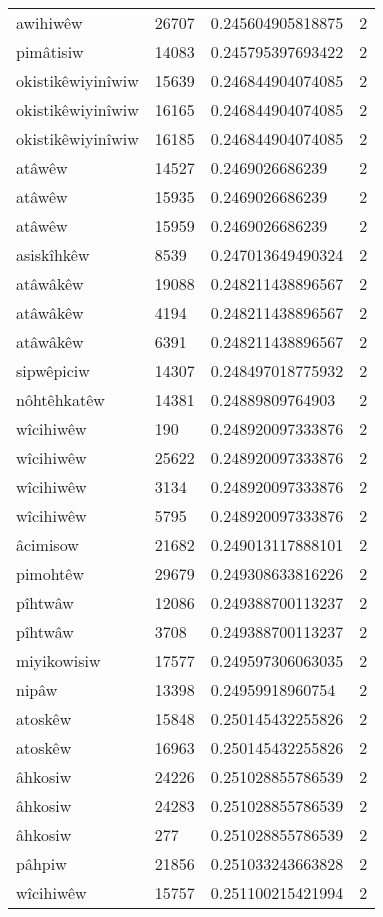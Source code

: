 \begin{longtable}{llll}
awihiwêw & 26707 & 0.245604905818875 & 2 \\
pimâtisiw & 14083 & 0.245795397693422 & 2 \\
okistikêwiyinîwiw & 15639 & 0.246844904074085 & 2 \\
okistikêwiyinîwiw & 16165 & 0.246844904074085 & 2 \\
okistikêwiyinîwiw & 16185 & 0.246844904074085 & 2 \\
atâwêw & 14527 & 0.2469026686239 & 2 \\
atâwêw & 15935 & 0.2469026686239 & 2 \\
atâwêw & 15959 & 0.2469026686239 & 2 \\
asiskîhkêw & 8539 & 0.247013649490324 & 2 \\
atâwâkêw & 19088 & 0.248211438896567 & 2 \\
atâwâkêw & 4194 & 0.248211438896567 & 2 \\
atâwâkêw & 6391 & 0.248211438896567 & 2 \\
sipwêpiciw & 14307 & 0.248497018775932 & 2 \\
nôhtêhkatêw & 14381 & 0.24889809764903 & 2 \\
wîcihiwêw & 190 & 0.248920097333876 & 2 \\
wîcihiwêw & 25622 & 0.248920097333876 & 2 \\
wîcihiwêw & 3134 & 0.248920097333876 & 2 \\
wîcihiwêw & 5795 & 0.248920097333876 & 2 \\
âcimisow & 21682 & 0.249013117888101 & 2 \\
pimohtêw & 29679 & 0.249308633816226 & 2 \\
pîhtwâw & 12086 & 0.249388700113237 & 2 \\
pîhtwâw & 3708 & 0.249388700113237 & 2 \\
miyikowisiw & 17577 & 0.249597306063035 & 2 \\
nipâw & 13398 & 0.24959918960754 & 2 \\
atoskêw & 15848 & 0.250145432255826 & 2 \\
atoskêw & 16963 & 0.250145432255826 & 2 \\
âhkosiw & 24226 & 0.251028855786539 & 2 \\
âhkosiw & 24283 & 0.251028855786539 & 2 \\
âhkosiw & 277 & 0.251028855786539 & 2 \\
pâhpiw & 21856 & 0.251033243663828 & 2 \\
wîcihiwêw & 15757 & 0.251100215421994 & 2 \\

\end{longtable}
